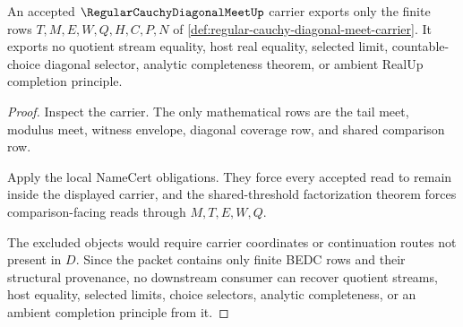 \begin{theorem}
\label{thm:regular-cauchy-diagonal-meet-nonescape}
An accepted $\RegularCauchyDiagonalMeetUp$ carrier exports only the finite rows $T,M,E,W,Q,H,C,P,N$ of \autoref{def:regular-cauchy-diagonal-meet-carrier}. It exports no quotient stream equality, host real equality, selected limit, countable-choice diagonal selector, analytic completeness theorem, or ambient RealUp completion principle.
\end{theorem}
\begin{proof}
Inspect the carrier. The only mathematical rows are the tail meet, modulus meet, witness envelope, diagonal coverage row, and shared comparison row.

Apply the local NameCert obligations. They force every accepted read to remain inside the displayed carrier, and the shared-threshold factorization theorem forces comparison-facing reads through $M,T,E,W,Q$.

The excluded objects would require carrier coordinates or continuation routes not present in $D$. Since the packet contains only finite BEDC rows and their structural provenance, no downstream consumer can recover quotient streams, host equality, selected limits, choice selectors, analytic completeness, or an ambient completion principle from it.
\end{proof}

